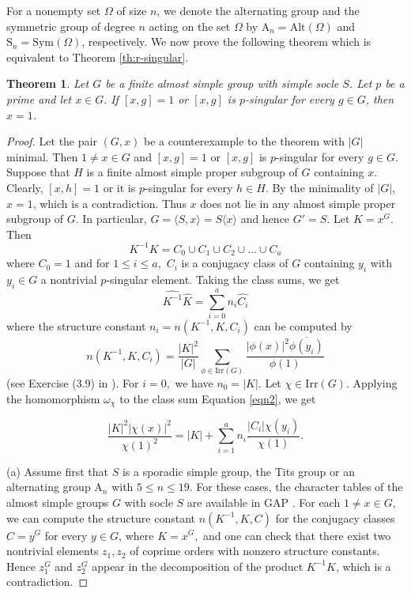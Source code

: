 \documentclass[twoside,a4paper,reqno,12pt]{amsart}
\newcommand{\<}{\langle}
\renewcommand{\>}{\rangle}
\newcommand{\la}{\langle}
\newcommand{\ra}{\rangle}
\newcommand{\leqs}{\leqslant}
\newcommand{\Irr}{\mathrm {Irr}}
\newcommand{\Alt}{\mathrm {Alt}}
\newcommand{\Sym}{\mathrm {Sym}}
\newcommand{\SSS}{\mathrm {S}}
\newcommand{\AAA}{\mathrm {A}}
\renewcommand{\leq}{\leqs}
\renewcommand{\:}{\colon}
\newtheorem{thm}{Theorem}[section]
\theoremstyle{definition}
\begin{document}
For a nonempty set $\Omega$ of size $n$, we denote the alternating group and the symmetric group of degree $n$ acting on the set $\Omega$ by $\AAA_n=\Alt(\Omega)$ and $\SSS_n=\Sym(\Omega)$, respectively.
We now prove the following theorem which is equivalent to Theorem \ref{th:r-singular}.
\begin{thm}\label{th:almost-simple}
Let $G$ be a finite almost simple group with simple socle $S$. Let $p$ be a prime and let $x\in G.$ If $[x,g]=1$ or $[x,g]$ is $p$-singular for every $g\in G$, then $x=1$.
\end{thm}

\begin{proof}
Let the pair $(G,x)$ be a counterexample to the theorem with $|G|$ minimal. Then $1\neq x\in G$ and $[x,g]=1$ or  $[x,g]$ is $p$-singular for every $g\in G.$ Suppose that $H$ is a finite almost simple proper subgroup of $G$ containing $x$. Clearly, $[x,h]=1$ or it is $p$-singular for every $h\in H.$  By the minimality of $|G|$, $x=1$, which is a contradiction. Thus $x$ does not lie in any almost simple proper subgroup of $G$. In particular,  $G=\la S,x\ra=S\la x\ra$ and hence $G'=S$. Let $K=x^G.$ Then 
\begin{equation}\label{eqn1} K^{-1}K=C_0\cup C_1\cup C_2\cup\dots\cup C_a
\end{equation} where $C_0=1$ and for $1\leq i\leq a,$  $C_i$ is a conjugacy class of $G$ containing $y_i$ with $y_i\in G$ a nontrivial $p$-singular element. Taking the class sums, we get 
\begin{equation}\label{eqn2}\widehat{K^{-1}}\widehat{K}=\sum_{i=0}^a n_i \widehat{C_i}\end{equation}
 where the structure constant $n_i=n(K^{-1},K,C_i)$ can be computed by \begin{equation}\label{eqn3}n(K^{-1},K,C_i)=\dfrac{|K|^2}{|G|}\sum_{\phi\in\Irr(G)}\dfrac{|\phi(x)|^2\overline{\phi(y_i)}}{\phi(1)}\end{equation} (see Exercise (3.9) in \cite{Isaacs-ct}). For $i=0,$ we have $n_0=|K|.$
Let $\chi\in\Irr(G)$. Applying the homomorphism $\omega_\chi$ to the class sum Equation \eqref{eqn2}, we get

\begin{equation}\label{eqn4}
\dfrac{|K|^2|\chi(x)|^2}{\chi(1)^2}=|K|+\sum_{i=1}^a n_i\dfrac{|C_i|\chi(y_i)}{\chi(1)}.
\end{equation}

(a) Assume first that $S$ is a sporadic simple group, the Tits group or an alternating group $\AAA_n$ with $5\leq n\leq 19$. For these cases, the character tables of the almost simple groups $G$ with socle $S$ are available in GAP \cite{GAP}. For each $1\neq x\in G,$ we can compute the structure constant $n(K^{-1},K,C)$ for the conjugacy classes $C=y^G$ for every $y\in G$, where $K=x^G,$ and one can check that there exist two nontrivial elements $z_1,z_2$ of coprime orders with nonzero structure constants. Hence $z_1^G$ and $z_2^G$ appear in the decomposition of the product $K^{-1}K$, which is a contradiction.


\end{proof}
\end{document}
